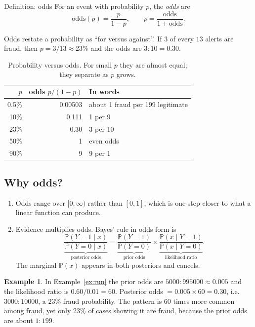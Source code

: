 \documentclass[11pt,a4paper]{article}
\newcommand{\Prob}{\mathbb{P}}
\theoremstyle{definition}
\newtheorem{example}{Example}
\begin{document}
\begin{metric}{Definition: odds}
For an event with probability $p$, the \emph{odds} are
\[
\text{odds}(p)=\frac{p}{1-p},\qquad p=\frac{\text{odds}}{1+\text{odds}}.
\]
\end{metric}

Odds restate a probability as ``for versus against''. If $3$ of every $13$ alerts are fraud, then $p=3/13\approx 23\%$ and the odds are $3:10=0.30$.

\begin{table}[h]
\centering
\begin{tabular}{rrl}
\toprule
$p$ & odds $p/(1-p)$ & In words\\
\midrule
0.5\% & 0.00503 & about 1 fraud per 199 legitimate\\
10\% & 0.111 & 1 per 9\\
23\% & 0.30 & 3 per 10\\
50\% & 1 & even odds\\
90\% & 9 & 9 per 1\\
\bottomrule
\end{tabular}
\caption{Probability versus odds. For small $p$ they are almost equal; they separate as $p$ grows.}
\end{table}

\subsection*{Why odds?}
\begin{enumerate}
\item Odds range over $[0,\infty)$ rather than $[0,1]$, which is one step closer to what a linear function can produce.
\item Evidence multiplies odds. Bayes' rule in odds form is
\[
\underbrace{\frac{\Prob(Y=1\mid x)}{\Prob(Y=0\mid x)}}_{\text{posterior odds}}
=\underbrace{\frac{\Prob(Y=1)}{\Prob(Y=0)}}_{\text{prior odds}}
\times
\underbrace{\frac{\Prob(x\mid Y=1)}{\Prob(x\mid Y=0)}}_{\text{likelihood ratio}}.
\]
The marginal $\Prob(x)$ appears in both posteriors and cancels.
\end{enumerate}

\begin{example}
In Example~\ref{ex:run} the prior odds are $5000:995000\approx 0.005$ and the likelihood ratio is $0.60/0.01=60$. Posterior odds $=0.005\times 60=0.30$, i.e.\ $3000:10000$, a $23\%$ fraud probability. The pattern is $60$ times more common among fraud, yet only $23\%$ of cases showing it are fraud, because the prior odds are about $1:199$.
\end{example}
\end{document}

